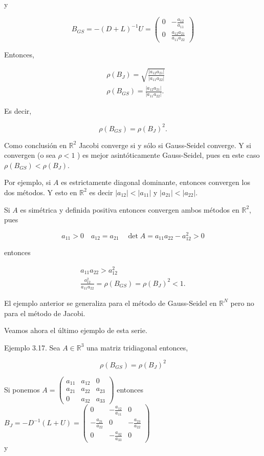 \documentclass[10pt]{book}
\begin{document}
y

$$
B_{G S}=-(D+L)^{-1} U=\left(\begin{array}{cc}
0 & -\frac{a_{12}}{a_{11}} \\
0 & \frac{a_{12} a_{21}}{a_{11} a_{22}}
\end{array}\right)
$$

Entonces,

$$
\begin{aligned}
& \rho\left(B_{J}\right)=\sqrt{\frac{\left|a_{12} a_{21}\right|}{\left|a_{11} a_{22}\right|}} \\
& \rho\left(B_{G S}\right)=\frac{\left|a_{12} a_{21}\right|}{\left|a_{11} a_{22}\right|} .
\end{aligned}
$$

Es decir,

$$
\rho\left(B_{G S}\right)=\rho\left(B_{J}\right)^{2} .
$$

Como conclusión en $\mathbb{R}^{2}$ Jacobi converge si y sólo si Gauss-Seidel converge. Y si convergen (o sea $\rho<1$ ) es mejor asintóticamente Gauss-Seidel, pues en este caso $\rho\left(B_{G S}\right)<\rho\left(B_{J}\right)$.

Por ejemplo, si $A$ es estrictamente diagonal dominante, entonces convergen los dos métodos. Y esto en $\mathbb{R}^{2}$ es decir $\left|a_{12}\right|<\left|a_{11}\right|$ y $\left|a_{21}\right|<\left|a_{22}\right|$.

Si $A$ es simétrica y definida positiva entonces convergen ambos métodos en $\mathbb{R}^{2}$, pues

$$
a_{11}>0 \quad a_{12}=a_{21} \quad \operatorname{det} A=a_{11} a_{22}-a_{12}^{2}>0
$$

entonces

$$
\begin{gathered}
a_{11} a_{22}>a_{12}^{2} \\
\frac{a_{12}^{2}}{a_{11} a_{22}}=\rho\left(B_{G S}\right)=\rho\left(B_{J}\right)^{2}<1 .
\end{gathered}
$$

El ejemplo anterior se generaliza para el método de Gauss-Seidel en $\mathbb{R}^{N}$ pero no para el método de Jacobi.

Veamos ahora el último ejemplo de esta serie.

Ejemplo 3.17. Sea $A \in \mathbb{R}^{3}$ una matriz tridiagonal entonces,

$$
\rho\left(B_{G S}\right)=\rho\left(B_{J}\right)^{2}
$$

Si ponemos $A=\left(\begin{array}{ccc}a_{11} & a_{12} & 0 \\ a_{21} & a_{22} & a_{23} \\ 0 & a_{32} & a_{33}\end{array}\right)$ entonces $B_{J}=-D^{-1}(L+U)=\left(\begin{array}{ccc}0 & -\frac{a_{12}}{a_{11}} & 0 \\ -\frac{a_{21}}{a_{22}} & 0 & -\frac{a_{23}}{a_{22}} \\ 0 & -\frac{a_{32}}{a_{33}} & 0\end{array}\right)$\\
y
\end{document}
